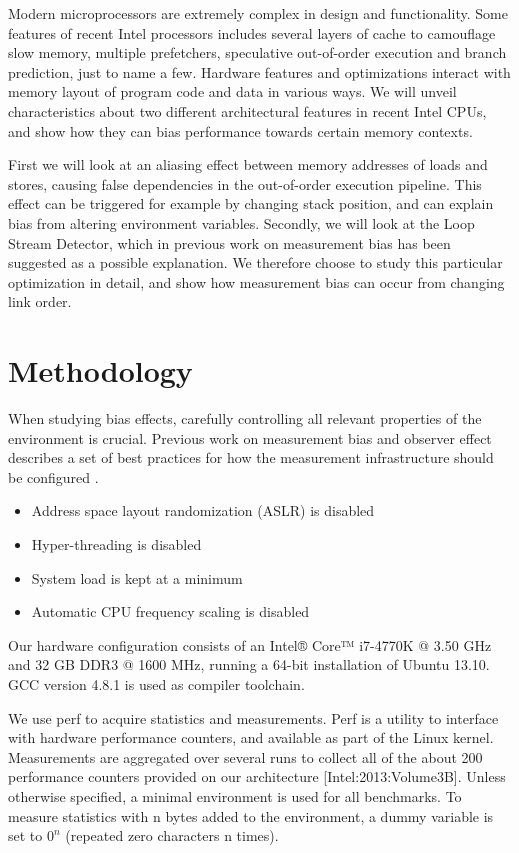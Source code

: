 \documentclass[a4paper,11pt,twocolumn,twoside]{article}
\begin{document}
Modern microprocessors are extremely complex in design and functionality. 
Some features of recent Intel processors includes several layers of cache to camouflage slow memory, multiple prefetchers, speculative out-of-order execution and branch prediction, just to name a few.
Hardware features and optimizations interact with memory layout of program code and data in various ways.
We will unveil characteristics about two different architectural features in recent Intel CPUs, and show how they can bias performance towards certain memory contexts. 

First we will look at an aliasing effect between memory addresses of loads and stores, causing false dependencies in the out-of-order execution pipeline. 
This effect can be triggered for example by changing stack position, and can explain bias from altering environment variables. 
Secondly, we will look at the Loop Stream Detector, which in previous work on measurement bias has been suggested as a possible explanation.
We therefore choose to study this particular optimization in detail, and show how measurement bias can occur from changing link order.


\section{Methodology}
When studying bias effects, carefully controlling all relevant properties of the environment is crucial. 
Previous work on measurement bias and observer effect describes a set of best practices for how the measurement infrastructure should be configured \cite{Mytkowicz:2009:WrongData, Mytkowicz:2008:OE&MB}. 
\begin{itemize}
  \item Address space layout randomization (ASLR) is disabled
  \item Hyper-threading is disabled
  \item System load is kept at a minimum
  \item Automatic CPU frequency scaling is disabled
\end{itemize}
Our hardware configuration consists of an Intel® Core™ i7-4770K @ 3.50 GHz and 32 GB DDR3 @ 1600 MHz, running a 64-bit installation of Ubuntu 13.10. GCC version 4.8.1 is used as compiler toolchain.

We use perf to acquire statistics and measurements.
Perf is a utility to interface with hardware performance counters, and available as part of the Linux kernel.
Measurements are aggregated over several runs to collect all of the about 200 performance counters provided on our architecture [Intel:2013:Volume3B]. 
Unless otherwise specified, a minimal environment is used for all benchmarks. 
To measure statistics with n bytes added to the environment, a dummy variable is set to \(0^{n}\) (repeated zero characters n times).
\end{document}
